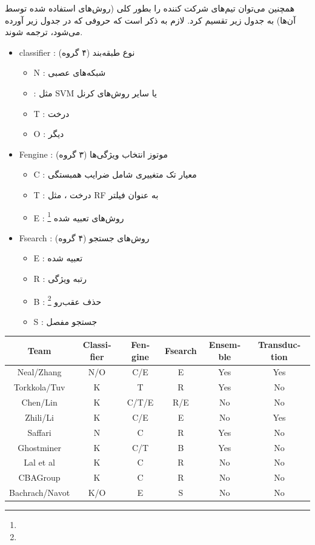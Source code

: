 \documentclass[a4paper, 12pt]{article}
\begin{document}
همچنین می‌توان تیم‌های شرکت کننده را بطور کلی (روش‌های استفاده شده توسط آن‌ها) به جدول زیر تقسیم کرد. لازم به ذکر است که حروفی که در جدول زیر آورده می‌شود، ترجمه شوند.
\begin{itemize}
	\item 
	classifier 
	:
	نوع طبقه‌بند (۴ گروه)
	\begin{itemize}
		\item 
		N :
		شبکه‌های عصبی
		\item
		 :
		مثل SVM یا سایر روش‌های کرنل
		\item
		T
		:
		درخت
		\item
		O 
		:
		دیگر
	\end{itemize}
	\item
	Fengine :
	موتوز انتخاب ویژگی‌ها (۳ گروه)
	\begin{itemize}
		\item 
		C :
		معیار تک متغییری شامل ضرایب همبستگی
		\item
		T :
		درخت ، مثل RF به عنوان فیلتر
		\item
		E :
		روش‌های تعبیه شده 
		\footnote{}
	\end{itemize}
	\item
	Fsearch :
	روش‌های جستجو  (۴ گروه)
	\begin{itemize}
		\item 
		E :
		تعبیه شده
		\item
		R
		:
		رتبه ویژگی
		\item
		B :
		حذف عقب‌رو
		\footnote{}
		\item
		S
		:
		جستجو مفصل
	\end{itemize}
\end{itemize} 

\begin{center}
	\begin{latin}
		\begin{tabular}{|c|c|c|c|c|c|}
			\hline
			Team & Classifier &  Fengine & Fsearch & Ensemble & Transduction 
			\\\hline
			Neal/Zhang & N/O& C/E& E &Yes& Yes
			\\\hline
			Torkkola/Tuv &K &T &R& Yes& No
			\\\hline
			Chen/Lin &K& C/T/E& R/E& No& No
			\\\hline
			Zhili/Li &K &C/E& E &No& Yes
			\\\hline
			Saffari &N &C &R &Yes& No
			\\\hline
			Ghostminer &K &C/T& B &Yes& No
			\\\hline
			Lal et al &K &C &R& No& No
			\\\hline
			CBAGroup &K &C &R &No& No
			\\\hline
			Bachrach/Navot &K/O &E &S &No &No
			\\\hline
		\end{tabular}
	\end{latin}
\end{center}
\end{document}
